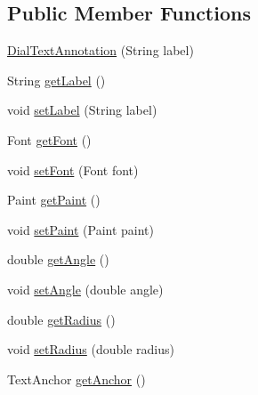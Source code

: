 \subsection*{Public Member Functions}
\begin{DoxyCompactItemize}
\item 
\mbox{\hyperlink{classorg_1_1jfree_1_1chart_1_1plot_1_1dial_1_1_dial_text_annotation_ad5d9d0316a3bd184d20c2d93d6b0e045}{Dial\+Text\+Annotation}} (String label)
\item 
String \mbox{\hyperlink{classorg_1_1jfree_1_1chart_1_1plot_1_1dial_1_1_dial_text_annotation_a4a323befb5330a7235ab440acb7ed7f3}{get\+Label}} ()
\item 
void \mbox{\hyperlink{classorg_1_1jfree_1_1chart_1_1plot_1_1dial_1_1_dial_text_annotation_af2af7c2986a8714ee9cd3cc940c1603b}{set\+Label}} (String label)
\item 
Font \mbox{\hyperlink{classorg_1_1jfree_1_1chart_1_1plot_1_1dial_1_1_dial_text_annotation_ae6f8a6c1529da255183d2c72957ab9c0}{get\+Font}} ()
\item 
void \mbox{\hyperlink{classorg_1_1jfree_1_1chart_1_1plot_1_1dial_1_1_dial_text_annotation_ad278fcc853d254432be2fe0d9d9e15e5}{set\+Font}} (Font font)
\item 
Paint \mbox{\hyperlink{classorg_1_1jfree_1_1chart_1_1plot_1_1dial_1_1_dial_text_annotation_ac86f835c243012c82ef02228b910064d}{get\+Paint}} ()
\item 
void \mbox{\hyperlink{classorg_1_1jfree_1_1chart_1_1plot_1_1dial_1_1_dial_text_annotation_a2387e078af17fa2b1882aea73b804e03}{set\+Paint}} (Paint paint)
\item 
double \mbox{\hyperlink{classorg_1_1jfree_1_1chart_1_1plot_1_1dial_1_1_dial_text_annotation_ac5edd17a18442f02b1fda90fdc71b5ba}{get\+Angle}} ()
\item 
void \mbox{\hyperlink{classorg_1_1jfree_1_1chart_1_1plot_1_1dial_1_1_dial_text_annotation_a10212bd12fd87d4c9c8a89658fea5d09}{set\+Angle}} (double angle)
\item 
double \mbox{\hyperlink{classorg_1_1jfree_1_1chart_1_1plot_1_1dial_1_1_dial_text_annotation_a67f7b7e58b013b48901d0d80a22bbef5}{get\+Radius}} ()
\item 
void \mbox{\hyperlink{classorg_1_1jfree_1_1chart_1_1plot_1_1dial_1_1_dial_text_annotation_a965ee047f464d6e4d7b8ec01f18bf913}{set\+Radius}} (double radius)
\item 
Text\+Anchor \mbox{\hyperlink{classorg_1_1jfree_1_1chart_1_1plot_1_1dial_1_1_dial_text_annotation_a784089eb314baac5cacb0973fb328b92}{get\+Anchor}} ()

\end{DoxyCompactItemize}
